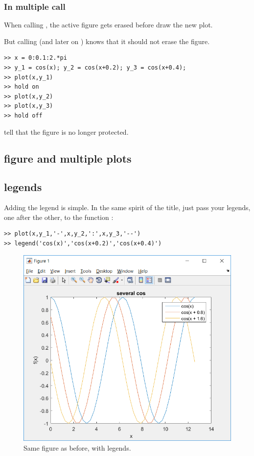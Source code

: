 		\subsubsection{In multiple call}
			When calling , the active figure gets erased before \matlab draw the new plot.
			
			But calling  (and later on ) \matlab knows that it should not erase the figure.
\begin{lstlisting}
>> x = 0:0.1:2.*pi
>> y_1 = cos(x); y_2 = cos(x+0.2); y_3 = cos(x+0.4);
>> plot(x,y_1)
>> hold on
>> plot(x,y_2)
>> plot(x,y_3)
>> hold off
\end{lstlisting}
			 tell \matlab that the figure is no longer protected.

	\subsection{figure and multiple plots}


	\subsection{legends}
		Adding the legend is simple.
		In the same spirit of the title, just pass your legends, one after the other, to the function :
\begin{lstlisting}
>> plot(x,y_1,'-',x,y_2,':',x,y_3,'--')
>> legend('cos(x)','cos(x+0.2)','cos(x+0.4)')
\end{lstlisting}

		\begin{figure}
			\center
			\includegraphics[height=0.43\linewidth]{./fig/multi_plot_legend.PNG} 
			\caption{
				Same figure as before, with legends.
			}
			\label{fig-legend}
		\end{figure}	







